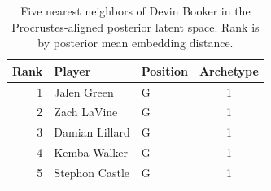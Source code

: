 \begin{table}[htbp]
  \centering\small
  \begin{tabular}{rllc}
    \toprule
    Rank & Player & Position & Archetype \\
    \midrule
    1 & Jalen Green & G & 1 \\
    2 & Zach LaVine & G & 1 \\
    3 & Damian Lillard & G & 1 \\
    4 & Kemba Walker & G & 1 \\
    5 & Stephon Castle & G & 1 \\
    \bottomrule
  \end{tabular}
  \caption{Five nearest neighbors of Devin Booker in the Procrustes-aligned posterior latent space. Rank is by posterior mean embedding distance.}
  \label{tab:Devin_Booker_neighbors}
\end{table}

